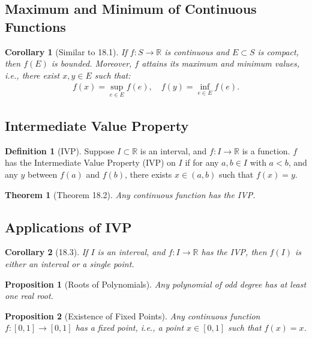\documentclass[9pt]{article}
\theoremstyle{definition}
\newtheorem{definition}{Definition}
\theoremstyle{plain}
\newtheorem{theorem}{Theorem}
\newtheorem{proposition}{Proposition}
\newtheorem{corollary}{Corollary}
\begin{document}
\subsection*{Maximum and Minimum of Continuous Functions}
\begin{corollary}[Similar to 18.1]
If $ f : S \to \mathbb{R} $ is continuous and $ E \subset S $ is compact, then $ f(E) $ is bounded. Moreover, $ f $ attains its maximum and minimum values, i.e., there exist $ x, y \in E $ such that:
\begin{align}
f(x) = \sup_{e \in E} f(e), \quad f(y) = \inf_{e \in E} f(e).
\end{align}
\end{corollary}

\subsection*{Intermediate Value Property}
\begin{definition}[IVP]
Suppose $ I \subset \mathbb{R} $ is an interval, and $ f : I \to \mathbb{R} $ is a function. $ f $ has the Intermediate Value Property (IVP) on $ I $ if for any $ a, b \in I $ with $ a < b $, and any $ y $ between $ f(a) $ and $ f(b) $, there exists $ x \in (a, b) $ such that $ f(x) = y $.
\end{definition}

\begin{theorem}[Theorem 18.2]
Any continuous function has the IVP.
\end{theorem}

\subsection*{Applications of IVP}
\begin{corollary}[18.3]
If $ I $ is an interval, and $ f : I \to \mathbb{R} $ has the IVP, then $ f(I) $ is either an interval or a single point.
\end{corollary}

\begin{proposition}[Roots of Polynomials]
Any polynomial of odd degree has at least one real root.
\end{proposition}

\begin{proposition}[Existence of Fixed Points]
Any continuous function $ f : [0, 1] \to [0, 1] $ has a fixed point, i.e., a point $ x \in [0, 1] $ such that $ f(x) = x $.
\end{proposition}
\end{document}
